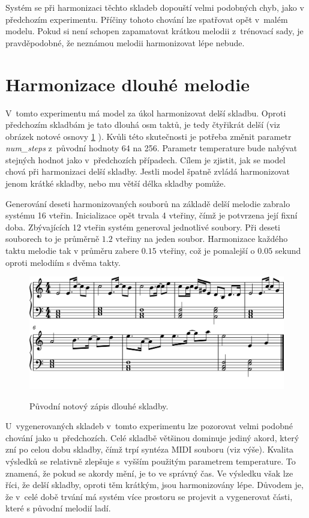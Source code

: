 Systém se při harmonizaci těchto skladeb dopouští velmi podobných chyb, 
jako v předchozím experimentu.
Příčiny tohoto chování lze spatřovat opět v~malém modelu.
Pokud si není schopen zapamatovat krátkou melodii z~trénovací sady,
je pravděpodobné, že neznámou melodii harmonizovat lépe nebude.

\section{Harmonizace dlouhé melodie}
V~tomto experimentu má model za úkol harmonizovat delší skladbu.
Oproti předchozím skladbám je tato dlouhá osm taktů, je tedy čtyřikrát delší
(viz obrázek notové osnovy \ref{obrazekMyHarmonyLongNoty} ).
Kvůli této skutečnosti je potřeba změnit parametr \emph{num\_steps} 
z~původní hodnoty 64 na 256.
Parametr temperature bude nabývat stejných hodnot jako v~předchozích případech.
Cílem je zjistit, jak se model chová při harmonizaci delší skladby.
Jestli model špatně zvládá harmonizovat jenom krátké skladby, 
nebo mu větší délka skladby pomůže.
\par
Generování deseti harmonizovaných souborů na základě delší melodie
zabralo systému 16 vteřin. 
Inicializace opět trvala 4 vteřiny, čímž je potvrzena její fixní doba.
Zbývajících 12 vteřin systém generoval jednotlivé soubory.
Při deseti souborech to je průměrně $1.2$ vteřiny na jeden soubor.
Harmonizace každého taktu melodie tak v průměru zabere $0.15$ vteřiny,
což je pomalejší o $0.05$ sekund oproti melodiím s dvěma takty.

\begin{figure}[h]\centering
    \centering
    \includegraphics[width=0.8\linewidth]{obrazky/MyMelodyLongKHarmonizaciNoty-1.png}\\[1pt]  
    \caption{Původní notový zápis dlouhé skladby.}    
    \label{obrazekMyHarmonyLongNoty}
\end{figure}
\par

U~vygenerovaných skladeb v~tomto experimentu lze pozorovat velmi podobné chování
jako u~předchozích.
Celé skladbě většinou dominuje jediný akord, který zní po celou dobu skladby,
čímž trpí syntéza MIDI souboru (viz výše).
Kvalita výsledků se relativně zlepšuje s~vyšším použitým parametrem temperature.
To znamená, že pokud se akordy mění, je to ve správný čas.
Ve výsledku však lze říci, že delší skladby, oproti těm krátkým, 
jsou harmonizovány lépe.
Důvodem je, že v~celé době trvání má systém více prostoru se projevit 
a vygenerovat části, které s původní melodií ladí.
\par

